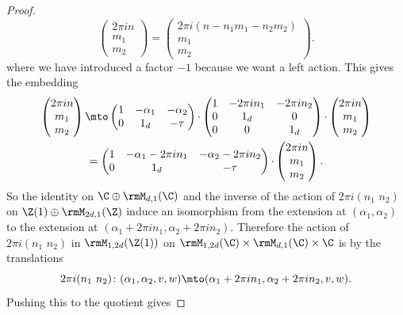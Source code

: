 \begin{proof}
\[\begin{pmatrix}
2\pi in \\ m_1\\ m_2
\end{pmatrix}
 =
\begin{pmatrix}
2\pi i(n - n_1m_1 - n_2m_2) \\ m_1\\ m_2
\end{pmatrix}.
\]
where we have introduced a factor $-1$ because we want a left
action. This gives the embedding
\begin{multline*}
\begin{pmatrix}
2\pi in \\ m_1\\ m_2
\end{pmatrix}
 \mto
\begin{pmatrix}
1 & -\alpha_1 & -\alpha_2\\0 & 1_d & -\tau
\end{pmatrix}{\cdot}
\begin{pmatrix}
1 & -2\pi in_1 & -2\pi i n_2\\
0 & 1_d & 0 \\
0 & 0 & 1_d
\end{pmatrix} {\cdot}
\begin{pmatrix}
2\pi in \\ m_1\\ m_2
\end{pmatrix} \\
 =
\begin{pmatrix}
1 & -\alpha_1-2\pi i n_1 & -\alpha_2-2\pi i n_2\\0 & 1_d & -\tau
\end{pmatrix}{\cdot}
\begin{pmatrix}
2\pi in \\ m_1\\ m_2
\end{pmatrix}.
\end{multline*}
So the identity on $\C\oplus\rmM_{d,1}(\C)$ and the inverse of the
action of $2\pi i(n_1\,\, n_2)$ on $\Z(1)\oplus\rmM_{2d,1}(\Z)$ induce
an isomorphism from the extension at $(\alpha_1,\alpha_2)$ to the
extension at $(\alpha_1+2\pi i n_1, \alpha_2+2\pi i n_2)$.
Therefore the action of $2\pi i(n_1\,\, n_2)$ in $\rmM_{1,2d}(\Z(1))$
on $\rmM_{1,2d}(\C)\times \rmM_{d,1}(\C)\times\C$ is by the translations
\[
2\pi i(n_1\,\, n_2)\colon (\alpha_1,\alpha_2,v,w)\mto
(\alpha_1+2\pi i n_1, \alpha_2+2\pi i n_2, v, w).
\]
Pushing this to the quotient gives

\end{proof}
